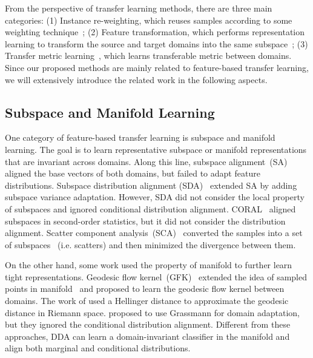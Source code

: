 \documentclass[acmsmall]{acmart}
\begin{document}
From the perspective of transfer learning methods, there are three main categories: (1) Instance re-weighting, which reuses samples according to some weighting technique~\cite{dai2007boosting,dai2007co,tan2015transitive}; (2) Feature transformation, which performs representation learning to transform the source and target domains into the same subspace~\cite{long2018conditional,wang2017balanced,zhang2017joint,pan2011domain}; (3) Transfer metric learning~\cite{luo2018transfer,luo2014decomposition,luo2018online}, which learns transferable metric between domains. Since our proposed methods are mainly related to feature-based transfer learning, we will extensively introduce the related work in the following aspects.



\subsection{Subspace and Manifold Learning}

One category of feature-based transfer learning is subspace and manifold learning. The goal is to learn representative subspace or manifold representations that are invariant across domains. Along this line, subspace alignment~(SA)~\cite{fernando2013unsupervised} aligned the base vectors of both domains, but failed to adapt feature distributions. Subspace distribution alignment (SDA)~\cite{sun2015subspace} extended SA by adding subspace variance adaptation. However, SDA did not consider the local property of subspaces and ignored conditional distribution alignment. CORAL~\cite{sun2016return} aligned subspaces in second-order statistics, but it did not consider the distribution alignment. Scatter component analysis~(SCA)~\cite{ghifary2017scatter} converted the samples into a set of subspaces ~(i.e. scatters) and then minimized the divergence between them. 

On the other hand, some work used the property of manifold to further learn tight representations. Geodesic flow kernel~(GFK)~\cite{gong2012geodesic} extended the idea of sampled points in manifold~\cite{gopalan2011domain} and proposed to learn the geodesic flow kernel between domains. The work of \cite{baktashmotlagh2014domain} used a Hellinger distance to approximate the geodesic distance in Riemann space. \cite{baktashmotlagh2013unsupervised} proposed to use Grassmann for domain adaptation, but they ignored the conditional distribution alignment. Different from these approaches, DDA can learn a domain-invariant classifier in the manifold and align both marginal and conditional distributions.
\end{document}
